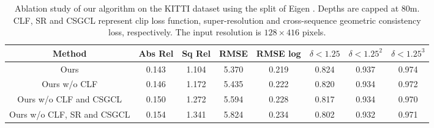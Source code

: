 \documentclass[10pt,twocolumn,letterpaper]{article}
\begin{document}
\begin{table*}
	\small
	\begin{center}
		\begin{tabular}{ c|c|c|c|c|c|c|c}
			\hline
			Method    & Abs Rel & Sq Rel & RMSE & RMSE log & $\delta  < 1.25$ & $\delta  < 1.25^2$ &  $\delta  < 1.25^3$\\
			\hline\hline
			Ours                            & 0.143 & 1.104 & 5.370 & 0.219 & 0.824 & 0.937& 0.974  \\
			Ours w/o CLF                    	& 0.146 & 1.172 & 5.435 & 0.222 & 0.820 & 0.934 & 0.972 \\
			Ours w/o CLF and CSGCL            & 0.150 & 1.272 & 5.594 & 0.228 & 0.817 & 0.934 & 0.970 \\ 
			Ours w/o CLF, SR and CSGCL        & 0.154 & 1.341 & 5.824 & 0.234 & 0.802 & 0.932 & 0.971 \\
			\hline
		\end{tabular}
	\end{center}
	\caption{ Ablation study of our algorithm on the KITTI dataset \cite{KITTI}  using the split of Eigen \etal \cite{EigenDepth}. Depths are  capped at 80m. CLF, SR and CSGCL represent clip loss function, super-resolution and cross-sequence geometric consistency loss, respectively. The input resolution is $128 \times 416$ pixels.} \label{table:ablation} %
\end{table*}
\end{document}
